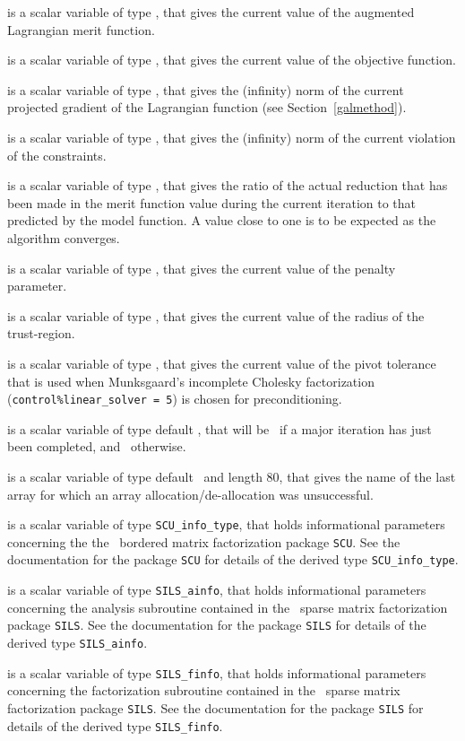 \documentclass{galahad}
\begin{document}
\begin{description}
 is a scalar variable of type \realdp, that gives
the current value of the augmented Lagrangian merit function.

 is a scalar variable of type \realdp, that gives
the current value of the objective function.

 is a scalar variable of type \realdp, that gives
the (infinity) norm of the current projected gradient of the Lagrangian
function (see Section~\ref{galmethod}).

 is a scalar variable of type \realdp, that gives
the (infinity) norm of the current violation of the constraints.

 is a scalar variable of type \realdp, that gives
the ratio of the actual reduction that has been made in the
merit function value during the current iteration to that
predicted by the model function.  A value close to one is to be expected
as the algorithm converges.

 is a scalar variable of type \realdp, that gives
the current value of the penalty parameter.

 is a scalar variable of type \realdp, that gives
the current value of the radius of the trust-region.

 is a scalar variable of type \realdp, that gives
the current value of the pivot tolerance that is
used when Munksgaard's incomplete Cholesky factorization
({\tt control\%linear\_sol\-ver = 5}) is chosen for preconditioning.

 is a scalar variable of type default \logical, that will be
\true\ if a major iteration has just been completed, and \false\ otherwise.

 is a scalar variable of type
default \character\ and length 80, that gives
the name of the last array for which an array allocation/de-allocation
was unsuccessful.

 is a scalar variable of type {\tt SCU\_info\_type}, that holds
informational parameters concerning the
the \galahad\ bordered matrix factorization package {\tt SCU}.
See the documentation for the package {\tt SCU} for details of the
derived type {\tt SCU\_info\_type}.

 is a scalar variable of type {\tt SILS\_ainfo}, that holds
informational parameters concerning the analysis subroutine contained in
the \galahad\ sparse matrix factorization package {\tt SILS}.
See the documentation for the package {\tt SILS} for details of the
derived type {\tt SILS\_ainfo}.

 is a scalar variable of type {\tt SILS\_finfo}, that holds
informational parameters concerning the factorization subroutine contained in
the \galahad\ sparse matrix factorization package {\tt SILS}.
See the documentation for the package {\tt SILS} for details of the
derived type {\tt SILS\_finfo}.

\end{description}
\end{document}
